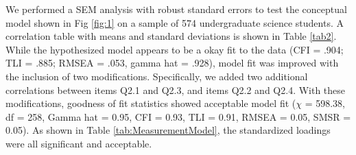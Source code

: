 We performed a SEM analysis with robust standard errors to test the conceptual model shown in Fig \ref{fig:1} on a sample of 574 undergraduate science students. A correlation table with means and standard deviations is shown in Table \ref{tab2}. While the hypothesized model appears to be a okay fit to the data (CFI = .904; TLI = .885;  RMSEA = .053, gamma hat =  .928), model fit was improved with the inclusion of two modifications. Specifically, we added two additional correlations between items Q2.1 and Q2.3, and items Q2.2 and Q2.4. With these modifications, goodness of fit statistics showed acceptable model fit \cite{hu1999cutoff, steiger2007understanding} ($\chi$ = 598.38, df = 258, Gamma hat = 0.95, CFI = 0.93, TLI = 0.91, RMSEA = 0.05, SMSR = 0.05). As shown in Table \ref{tab:MeasurementModel}, the standardized loadings were all significant and acceptable. 



